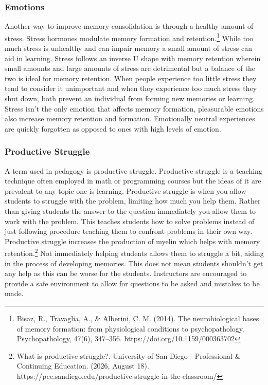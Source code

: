 \documentclass{article}[12pt]
\begin{document}
\subsubsection{Emotions}
Another way to improve memory consolidation is through a healthy amount of stress. Stress hormones modulate memory formation and retention.\footnote{\raggedright Bisaz, R., Travaglia, A., \& Alberini, C. M. (2014). The neurobiological bases of memory formation: from physiological conditions to psychopathology. Psychopathology, 47(6), 347–356. https://doi.org/10.1159/000363702} While too much stress is unhealthy and can impair memory a small amount of stress can aid in learning. Stress follows an inverse U shape with memory retention wherein small amounts and large amounts of stress are detrimental but a balance of the two is ideal for memory retention. When people experience too little stress they tend to consider it unimportant and when they experience too much stress they shut down, both prevent an individual from forming new memories or learning. Stress isn't the only emotion that affects memory formation, pleasurable emotions also increase memory retention and formation. Emotionally neutral experiences are quickly forgotten as opposed to ones with high levels of emotion. 

\subsubsection{Productive Struggle}
A term used in pedagogy is productive struggle. Productive struggle is a teaching technique often employed in math or programming courses but the ideas of it are prevalent to any topic one is learning. Productive struggle is when you allow students to struggle with the problem, limiting how much you help them. Rather than giving students the answer to the question immediately you allow them to work with the problem. This teaches students how to solve problems instead of just following procedure teaching them to confront problems in their own way. Productive struggle increases the production of myelin which helps with memory retention.\footnote{\raggedright What is productive struggle?. University of San Diego - Professional \& Continuing Education. (2026, August 18). https://pce.sandiego.edu/productive-struggle-in-the-classroom/ } Not immediately helping students allows them to struggle a bit, aiding in the process of developing memories. This does not mean students shouldn't get any help as this can be worse for the students. Instructors are encouraged to provide a safe environment to allow for questions to be asked and mistakes to be made. 
\end{document}

